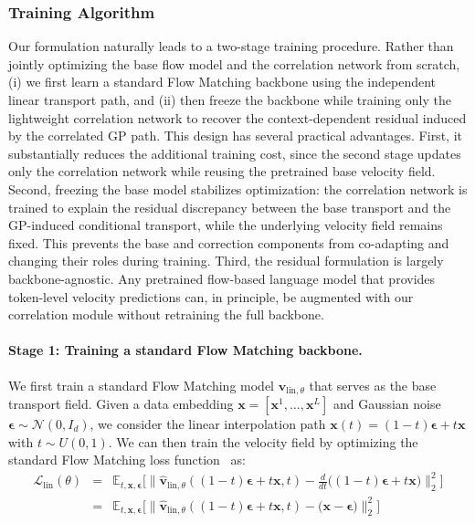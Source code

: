 \documentclass{article} %
\begin{document}
\subsubsection{Training Algorithm}
 Our formulation naturally leads to a two-stage training procedure. Rather than jointly optimizing the base flow model and the correlation network from scratch, (i) we first learn a standard Flow Matching backbone using the independent linear transport path, and (ii) then freeze the backbone while training only the lightweight correlation network to recover the context-dependent residual induced by the correlated GP path. This design has several practical advantages. First, it substantially reduces the additional training cost, since the second stage updates only the correlation network while reusing the pretrained base velocity field. Second, freezing the base model stabilizes optimization: the correlation network is trained to explain the residual discrepancy between the base transport and the GP-induced conditional transport, while the underlying velocity field remains fixed. This prevents the base and correction components from co-adapting and changing their roles during training. Third, the residual formulation is largely backbone-agnostic. Any pretrained flow-based language model that provides token-level velocity predictions can, in principle, be augmented with our correlation module without retraining the full backbone.

\paragraph{Stage 1: Training a standard Flow Matching backbone.} We first train a standard Flow Matching model $\mathbf{v}_{\text{lin},\theta}$ that serves as the base transport field. Given a data embedding $\mathbf{x}=[\mathbf{x}^1,\ldots,\mathbf{x}^L]$ and Gaussian noise $\boldsymbol{\epsilon}\sim\mathcal{N}(0,I_{d})$, we consider the linear interpolation path $\mathbf{x}(t) = (1-t) \boldsymbol{\epsilon} + t \mathbf{x}$ with $t \sim U(0,1)$. We can then train the velocity field by optimizing the standard Flow Matching loss function~\citep{lipman2023flow} as:  
\begin{eqnarray}
    \mathcal{L}_{\text{lin}}(\theta) &=& \mathbb{E}_{t, \mathbf{x}, \boldsymbol{\epsilon}} \Big[\big\|\hat{\mathbf{v}}_{\text{lin}, \theta}( (1-t) \boldsymbol{\epsilon} + t \mathbf{x}, t) - \frac{d}{dt}\big(  (1-t) \boldsymbol{\epsilon} + t \mathbf{x}\big)\big\|^2_2 \Big] \\ \nonumber
    &=& \mathbb{E}_{t, \mathbf{x}, \boldsymbol{\epsilon}} \Big[\big\|\hat{\mathbf{v}}_{\text{lin}, \theta}( (1-t) \boldsymbol{\epsilon} + t \mathbf{x}, t) - \big(  \mathbf{x} - \boldsymbol{\epsilon}\big)\big\|^2_2 \Big]
\end{eqnarray}
\end{document}
